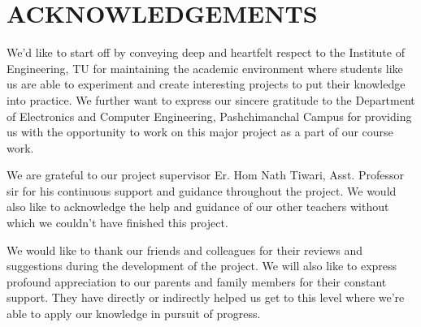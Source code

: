 \cleardoublepage
{}
\chapter*{ACKNOWLEDGEMENTS}

We'd like to start off by conveying deep and heartfelt respect to the Institute of Engineering, TU for maintaining the academic environment where students like us are able to experiment and create interesting projects to put their knowledge into practice. We further want to express our sincere gratitude to the Department of Electronics and Computer Engineering, Pashchimanchal Campus for providing us with the opportunity to work on this major project as a part of our course work.

We are grateful to our project supervisor Er. Hom Nath Tiwari, Asst. Professor sir for his continuous support and guidance throughout the project. We would also like to acknowledge the help and guidance of our other teachers without which we couldn't have finished this project.

We would like to thank our friends and colleagues for their reviews and suggestions during the development of the project. We will also like to express profound appreciation to our parents and family members for their constant support. They have directly or indirectly helped us get to this level where we're able to apply our knowledge in pursuit of progress.

\clearpage

